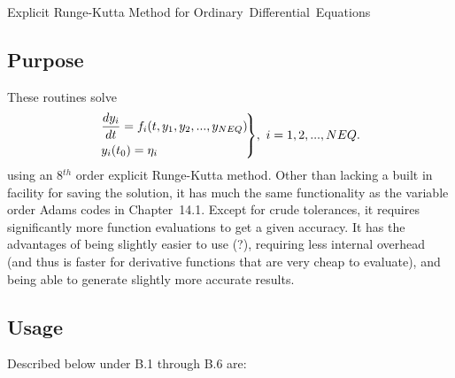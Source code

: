 \documentclass[twoside]{MATH77}
\begin{document}
 Explicit Runge-Kutta Method for
Ordinary~Differential~Equations


\subsection{Purpose}

These routines solve
\begin{equation}
\label{O1}\!\!\!\left.
\begin{array}{l}
\displaystyle\frac{dy_i}{dt}=f_i(t,y_1,y_2,...,y_{NEQ})\vspace{4pt} \\
\displaystyle y_i(t_0)=\eta _i
\end{array}
\!\!\!\!\right\} \!,\ i=1,2,...,NEQ.
\end{equation}
using an 8$^{th}$ order explicit Runge-Kutta method.  Other than lacking a
built in facility for saving the solution, it has much the same functionality
as the variable order Adams codes in Chapter~14.1.  Except for crude
tolerances, it requires significantly more function evaluations to get a given
accuracy.  It has the advantages of being slightly easier to use (?),
requiring less internal overhead (and thus is faster for derivative functions
that are very cheap to evaluate), and being able to generate slightly more
accurate results.

\subsection{Usage}

Described below under B.1 through B.6 are:
\end{document}
